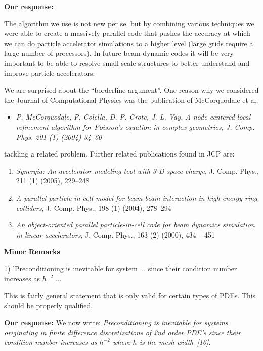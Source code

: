 \documentclass[10pt,pdftex]{report}
\begin{document}
{\textbf{Our response:}} 

The algorithm we use is not new per se, but by combining various techniques
we were able to create a massively parallel code that pushes the accuracy
at which we can do particle accelerator simulations to a higher level (large
grids require a large number of processors). In future beam dynamic codes
it will be very important to be able to resolve small scale structures to
better understand and improve particle accelerators.

We are surprised about the ``borderline argument''. One reason why we
considered the Journal of Computational Physics was the publication of
McCorquodale et al.
%
\begin{itemize}
\item {\it P. McCorquodale, P. Colella, D. P. Grote, J.-L. Vay, A
    node-centered local refinement algorithm for Poisson's equation in
    complex geometries, J. Comp. Phys. 201 (1) (2004) 34--60}
\end{itemize}
%
tackling a related problem. 
Further related publications found in JCP are:

\begin{enumerate}
\item {\it Synergia: An accelerator modeling tool with 3-D space charge},
  J. Comp. Phys., 211 (1) (2005), 229--248

\item {\it A parallel particle-in-cell model for beam-beam interaction
    in high energy ring colliders}, J. Comp. Phys., 198 (1) (2004),
  278--294

\item {\it An object-oriented parallel particle-in-cell code for beam
    dynamics simulation in linear accelerators}, J. Comp. Phys., 163 (2)
  (2000), 434 -- 451
\end{enumerate}

{\bf Minor Remarks}

1) 'Preconditioning is inevitable for system ... since their condition number
increases as $h^{-2}$ ...

This is fairly general statement that is only valid for certain types of PDEs.
This should be properly qualified.

{\textbf{Our response:}} We now write: {\it Preconditioning is inevitable
for systems originating in finite difference discretizations of 2nd order
PDE's since their condition number increases as $h^{-2}$ where $h$ is the
mesh width~[16]. }
\end{document}

